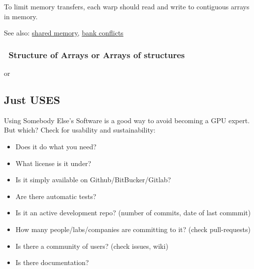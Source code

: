To limit memory transfers, each warp should read and write to contiguous
arrays in memory.

See also:
\href{https://devblogs.nvidia.com/parallelforall/using-shared-memory-cuda-cc/}{shared
memory},
\href{http://cuda-programming.blogspot.co.uk/2013/02/bank-conflicts-in-shared-memory-in-cuda.html}{bank
conflicts}

\subsubsection{~Structure of Arrays or Arrays of
structures}\label{structure-of-arrays-or-arrays-of-structures}

\begin{Shaded}
\begin{Highlighting}[]
  
\end{Highlighting}
\end{Shaded}

or

\begin{Shaded}
\begin{Highlighting}[]
 
\NormalTok{\};}
\end{Highlighting}
\end{Shaded}

\subsection{Just USES}\label{just-uses}

Using Somebody Else's Software is a good way to avoid becoming a GPU
expert. But which? Check for usability and sustainability:

\begin{itemize}
\itemsep1pt\parskip0pt
\item
  Does it do what you need?
\item
  What license is it under?
\item
  Is it simply available on Github/BitBucker/Gitlab?
\item
  Are there automatic tests?
\item
  Is it an active development repo? (number of commits, date of last
  commmit)
\item
  How many people/labs/companies are committing to it? (check
  pull-requests)
\item
  Is there a community of users? (check issues, wiki)
\item
  Is there documentation?
\end{itemize}

